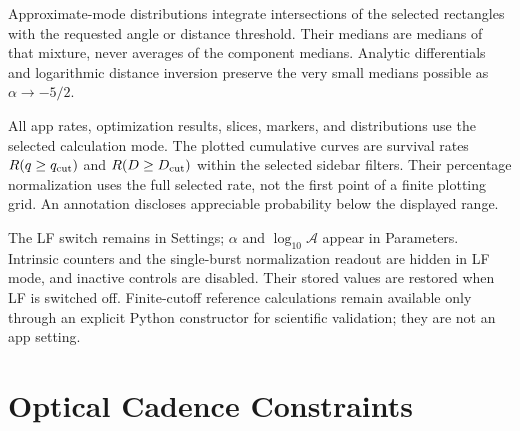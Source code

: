 \documentclass[11pt,a4paper]{article}
\begin{document}
Approximate-mode distributions integrate intersections of the selected
rectangles with the requested angle or distance threshold. Their medians are
medians of that mixture, never averages of the component medians. Analytic
differentials and logarithmic distance inversion preserve the very small
medians possible as $\alpha\to-5/2$.

All app rates, optimization results, slices, markers, and distributions use
the selected calculation mode. The plotted cumulative curves are survival
rates $R(q\ge q_{\rm cut})$ and $R(D\ge D_{\rm cut})$ within the selected
sidebar filters. Their percentage normalization uses the full selected rate,
not the first point of a finite plotting grid. An annotation discloses
appreciable probability below the displayed range.

The LF switch remains in Settings; $\alpha$ and $\log_{10}\mathcal A$ appear
in Parameters. Intrinsic counters and the single-burst normalization readout
are hidden in LF mode, and inactive controls are disabled. Their stored
values are restored when LF is switched off. Finite-cutoff reference
calculations remain available only through an explicit Python constructor
for scientific validation; they are not an app setting.

\section{Optical Cadence Constraints}
\end{document}
